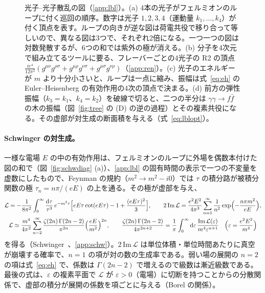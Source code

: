 \documentclass[a4paper,10pt]{ltjsarticle}
\newcommand{\dd}{\mathrm{d}}
\begin{document}
\begin{figure}[tbp]
\caption{光子--光子散乱の図（\ref{app:lbl}）。(a) 4本の光子がフェルミオンのループに付く巡回の順序。数字は光子 $1,2,3,4$（運動量 $k_1,\dots,k_4$）が付く頂点を表す。ループの向きが逆な図は荷電共役で移り合って等しいので、異なる図は3つで、それぞれ2倍になる。一つ一つの図は対数発散するが、6つの和では紫外の極が消える。(b) 分子を4次元で組み立てるツールに要る、フレーバーごとの4光子の R2 の頂点 $\frac{ie^4}{12\pi^2}(g^{\mu\nu}g^{\rho\sigma}+g^{\mu\rho}g^{\nu\sigma}+g^{\mu\sigma}g^{\nu\rho})$（\ref{app:ren}）。(c) 光子のエネルギーが $m$ より十分小さいと、ループは一点に縮み、振幅は式~\eqref{eq:eh} の Euler--Heisenberg の有効作用の4次の頂点で決まる。(d) 前方の弾性振幅（$k_3=k_1$、$k_4=k_2$）を破線で切ると、二つの半分は $\gamma\gamma\to f\bar f$ の木の振幅（図~\ref{fig:tree} の (D) の逆の過程）とその複素共役になる。その虚部が対生成の断面積を与える（式~\eqref{eq:lblopt}）。}
\label{fig:lbldiag}
\end{figure}

\paragraph{Schwinger の対生成。}一様な電場 $E$ の中の有効作用は、フェルミオンのループに外場を偶数本付けた図の和で（図~\ref{fig:schwdiag} (a)）、\ref{app:lbl} の固有時間の表示で一つの不変量を虚数にしたもので、Feynman の規約（$m^2\to m^2-i0$）では $\tau$ の積分路が被積分関数の極 $\tau_n=n\pi/(eE)$ の上を通る。その極が虚部を与え、
\begin{equation}
\begin{gathered}
\mathcal L=-\frac{1}{8\pi^2}\int_0^\infty\frac{\dd\tau}{\tau^3}\,e^{-m^2\tau}\Bigl[eE\tau\cot(eE\tau)-1+\frac{(eE\tau)^2}{3}\Bigr],\qquad
2\,\mathrm{Im}\,\mathcal L=\frac{e^2E^2}{4\pi^3}\sum_{n=1}^\infty\frac{1}{n^2}\exp\Bigl(-\frac{n\pi m^2}{eE}\Bigr),\\
\mathcal L\simeq\frac{m^4}{4\pi^2}\sum_{n=2}^\infty\frac{\zeta(2n)\,\Gamma(2n-2)}{\pi^{2n}}\Bigl(\frac{eE}{m^2}\Bigr)^{2n},\qquad
\frac{\zeta(2n)\,\Gamma(2n-2)}{4\pi^{2n+2}}=\frac1\pi\int_0^\infty\dd\varepsilon\,\frac{\mathrm{Im}\,\mathcal L(\varepsilon)}{m^4\varepsilon^{n+1}}\quad\Bigl(\varepsilon=\frac{e^2E^2}{m^4}\Bigr)
\end{gathered}
\label{eq:schw}
\end{equation}
を得る（Schwinger~\cite{schwinger51}、\ref{app:schw}）。$2\,\mathrm{Im}\,\mathcal L$ は単位体積・単位時間あたりに真空が崩壊する確率で、$n=1$ の項が対の数の生成率である。弱い場の展開の $n=2$ の項は式~\eqref{eq:eh} で、係数は $\Gamma(2n-2)$ で増えるので級数は漸近級数である。最後の式は、$\varepsilon$ の複素平面で $\mathcal L$ が $\varepsilon>0$（電場）に切断を持つことからの分散関係で、虚部の積分が展開の係数を項ごとに与える（Borel の関係）。
\end{document}
